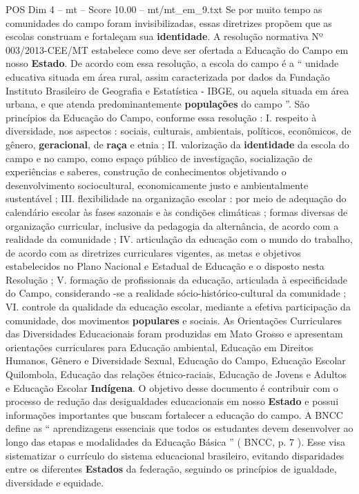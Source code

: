 \begin{textsample}{POS Dim 4 – mt – Score 10.00 – mt/mt\_em\_9.txt}
Se por muito tempo as comunidades do campo foram invisibilizadas, essas diretrizes propõem que as escolas construam e fortaleçam sua \textbf{identidade}.
A resolução normativa Nº 003/2013-CEE/MT estabelece como deve ser ofertada a Educação do Campo em nosso \textbf{Estado}.
De acordo com essa resolução, a escola do campo é a “ unidade educativa situada em área rural, assim caracterizada por dados da Fundação Instituto Brasileiro de Geografia e Estatística - IBGE, ou aquela situada em área urbana, e que atenda predominantemente \textbf{populações} do campo ”.
São princípios da Educação do Campo, conforme essa resolução : I. respeito à diversidade, nos aspectos : sociais, culturais, ambientais, políticos, econômicos, de gênero, \textbf{geracional}, de \textbf{raça} e etnia ; II. valorização da \textbf{identidade} da escola do campo e no campo, como espaço público de investigação, socialização de experiências e saberes, construção de conhecimentos objetivando o desenvolvimento sociocultural, economicamente justo e ambientalmente sustentável ; III. flexibilidade na organização escolar : por meio de adequação do calendário escolar às fases sazonais e às condições climáticas ; formas diversas de organização curricular, inclusive da pedagogia da alternância, de acordo com a realidade da comunidade ; IV. articulação da educação com o mundo do trabalho, de acordo com as diretrizes curriculares vigentes, as metas e objetivos estabelecidos no Plano Nacional e Estadual de Educação e o disposto nesta Resolução ; V. formação de profissionais da educação, articulada à especificidade do Campo, considerando -se a realidade sócio-histórico-cultural da comunidade ; VI. controle da qualidade da educação escolar, mediante a efetiva participação da comunidade, dos movimentos \textbf{populares} e sociais.
As Orientações Curriculares das Diversidades Educacionais foram produzidas em Mato Grosso e apresentam orientações curriculares para Educação ambiental, Educação em Direitos Humanos, Gênero e Diversidade Sexual, Educação do Campo, Educação Escolar Quilombola, Educação das relações étnico-raciais, Educação de Jovens e Adultos e Educação Escolar \textbf{Indígena}.
O objetivo desse documento é contribuir com o processo de redução das desigualdades educacionais em nosso \textbf{Estado} e possui informações importantes que buscam fortalecer a educação do campo.
A BNCC define as “ aprendizagens essenciais que todos os estudantes devem desenvolver ao longo das etapas e modalidades da Educação Básica ” ( BNCC, p. 7 ).
Esse visa sistematizar o currículo do sistema educacional brasileiro, evitando disparidades entre os diferentes \textbf{Estados} da federação, seguindo os princípios de igualdade, diversidade e equidade.

\end{textsample}
